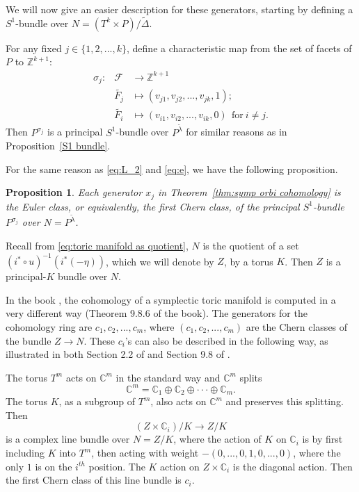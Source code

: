 \documentclass[12pt]{amsart}
\def\Z {{\mathbb{Z}}}
\def\F {{\mathcal{F}}}
\def\C {{\mathbb{C}}}
\def\cdots {{\cdot\cdot\cdot}}
\newtheorem{proposition}[theorem]{Proposition}
\theoremstyle{definition}
\numberwithin{equation}{section}
\begin{document}
 We will now give an easier description for these generators,
starting by defining a $S^1$-bundle over $N=(T^k\times
P)/\tilde{\Delta}$.

For any fixed $j\in\{1,2,...,k\}$, define a characteristic map from
the set of facets of $P$ to $\Z^{k+1}$:
\begin{eqnarray*}
\sigma_{j}: & \F &\rightarrow \Z^{k+1}\\
        & \tilde{F_{j}}&\mapsto (v_{j1},v_{j2},...,v_{jk},1);\\
        & \tilde{F_{i}}&\mapsto (v_{i1},v_{i2},...,v_{ik},0)\ \
        \mbox{for}\  i\neq j.
\end{eqnarray*}
Then $P^{\sigma_{j}}$ is a principal $S^1$-bundle over
$P^{\tilde{\lambda}}$ for similar reasons as in Proposition~\ref{S1
bundle}.

For the same reason as \eqref{eq:L_2} and \eqref{eq:e}, we have the
following proposition.

\begin{proposition} \label{prop:x_i is chern class of a artificial
bundle} Each generator $x_{j}$ in Theorem~\ref{thm:symp orbi
cohomology} is the Euler class, or equivalently, the first Chern
class, of the principal $S^1$-bundle $P^{\sigma_{j}}$ over
$N=P^{\tilde{\lambda}}$.
\end{proposition}

Recall from \eqref{eq:toric manifold as quotient}, $N$ is the
quotient of a set $(i^*\circ u)^{-1}(i^{*}(-\eta))$, which we will
denote by $Z$, by a torus $K$. Then $Z$ is a principal-$K$ bundle
over $N$.

In the book \cite{book:equivariant deRham}, the cohomology of a
symplectic toric manifold is computed in a very different way
(Theorem 9.8.6 of the book). The generators for the cohomology ring
are $c_{1},c_{2},...,c_{m}$, where $(c_{1},c_{2},...,c_{m})$ are the
Chern classes of the bundle $Z\rightarrow N$. These $c_{i}$'s can
also be described in the following way, as illustrated in both
Section 2.2 of \cite{Guillemin:book} and Section 9.8 of
\cite{book:equivariant deRham}.

The torus $T^m$ acts on $\C^m$ in the standard way and $\C^{m}$
splits
\begin{equation}
\C^m = \C_{1}\oplus \C_{2}\oplus\cdots \oplus \C_{m}.
\end{equation}
The torus $K$, as a subgroup of $T^m$, also acts on $\C^m$ and
preserves this splitting. Then
\begin{equation}
(Z\times \C_{i})/K\rightarrow Z/K
\end{equation}
is a complex line bundle over $N=Z/K$, where the action of $K$ on
$\C_{i}$ is by first including $K$ into $T^m$, then acting with
weight $-(0,...,0,1,0,...,0)$, where the only $1$ is on the $i^{th}$
position. The $K$ action on $Z\times \C_{i}$ is the diagonal action.
Then the first Chern class of this line bundle is $c_{i}$.
\end{document}
